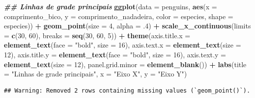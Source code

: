 \documentclass[
]{article}
\newenvironment{Shaded}{\begin{snugshade}}{\end{snugshade}}
\newcommand{\AttributeTok}[1]{\textcolor[rgb]{0.13,0.29,0.53}{#1}}
\newcommand{\DecValTok}[1]{\textcolor[rgb]{0.00,0.00,0.81}{#1}}
\newcommand{\DocumentationTok}[1]{\textcolor[rgb]{0.56,0.35,0.01}{\textbf{\textit{#1}}}}
\newcommand{\FunctionTok}[1]{\textcolor[rgb]{0.13,0.29,0.53}{\textbf{#1}}}
\newcommand{\NormalTok}[1]{#1}
\newcommand{\SpecialCharTok}[1]{\textcolor[rgb]{0.81,0.36,0.00}{\textbf{#1}}}
\newcommand{\StringTok}[1]{\textcolor[rgb]{0.31,0.60,0.02}{#1}}
\begin{document}
\begin{Shaded}
\begin{Highlighting}[]
\DocumentationTok{\#\# Linhas de grade principais}
\FunctionTok{ggplot}\NormalTok{(}\AttributeTok{data =}\NormalTok{ penguins, }
       \FunctionTok{aes}\NormalTok{(}\AttributeTok{x =}\NormalTok{ comprimento\_bico, }\AttributeTok{y =}\NormalTok{ comprimento\_nadadeira,}
           \AttributeTok{color =}\NormalTok{ especies, }\AttributeTok{shape =}\NormalTok{ especies)) }\SpecialCharTok{+}
    \FunctionTok{geom\_point}\NormalTok{(}\AttributeTok{size =} \DecValTok{4}\NormalTok{, }\AttributeTok{alpha =}\NormalTok{ .}\DecValTok{4}\NormalTok{) }\SpecialCharTok{+}
    \FunctionTok{scale\_x\_continuous}\NormalTok{(}\AttributeTok{limits =} \FunctionTok{c}\NormalTok{(}\DecValTok{30}\NormalTok{, }\DecValTok{60}\NormalTok{), }\AttributeTok{breaks =} \FunctionTok{seq}\NormalTok{(}\DecValTok{30}\NormalTok{, }\DecValTok{60}\NormalTok{, }\DecValTok{5}\NormalTok{)) }\SpecialCharTok{+}
    \FunctionTok{theme}\NormalTok{(}\AttributeTok{axis.title.x =} \FunctionTok{element\_text}\NormalTok{(}\AttributeTok{face =} \StringTok{"bold"}\NormalTok{, }\AttributeTok{size =} \DecValTok{16}\NormalTok{),}
          \AttributeTok{axis.text.x =} \FunctionTok{element\_text}\NormalTok{(}\AttributeTok{size =} \DecValTok{12}\NormalTok{),}
          \AttributeTok{axis.title.y =} \FunctionTok{element\_text}\NormalTok{(}\AttributeTok{face =} \StringTok{"bold"}\NormalTok{, }\AttributeTok{size =} \DecValTok{16}\NormalTok{),}
          \AttributeTok{axis.text.y =} \FunctionTok{element\_text}\NormalTok{(}\AttributeTok{size =} \DecValTok{12}\NormalTok{),}
          \AttributeTok{panel.grid.minor =} \FunctionTok{element\_blank}\NormalTok{()) }\SpecialCharTok{+}
    \FunctionTok{labs}\NormalTok{(}\AttributeTok{title =} \StringTok{"Linhas de grade principais"}\NormalTok{, }\AttributeTok{x =} \StringTok{"Eixo X"}\NormalTok{, }\AttributeTok{y =} \StringTok{"Eixo Y"}\NormalTok{)}
\end{Highlighting}
\end{Shaded}

\begin{verbatim}
## Warning: Removed 2 rows containing missing values (`geom_point()`).
\end{verbatim}
\end{document}
